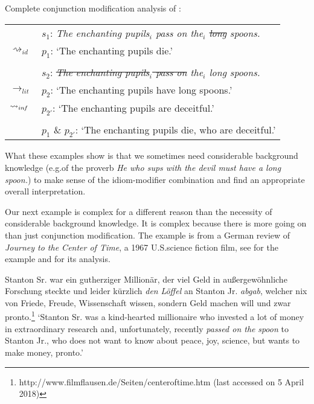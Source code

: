 \documentclass[output=paper]{langsci/langscibook}
\begin{document}
\ea \label{analysis long spoons -- complete} 
Complete conjunction modification analysis of : \\
\vspace{5pt}
\begin{tabular}{ll}
								& 	$s_{1}$: \hspace{4pt} \textit{The enchanting pupils$_{i}$ pass on the$_{i}$ \sout{long} spoons.} \\
$\rightsquigarrow_{id}$				&	$p_{1}$: \hspace{1pt} `The enchanting pupils die.' \\
\vspace{-5pt} \\
								& 	$s_{2}$: \hspace{4pt} \textit{\sout{The enchanting pupils$_{i}$ pass on} the$_{i}$ long spoons.} \\
$\rightarrow_{lit}$					&	$p_{2}$: \hspace{1pt} `The enchanting pupils have long spoons.' \\
$\rightsquigarrow_{in\hspace{-0.8pt} f}$	&	$p_{2'}$: \hspace{-1.5pt} `The enchanting pupils are deceitful.' \\
\vspace{-5pt} \\
								&	$p_{1}$ \& $p_{2'}$: `The enchanting pupils die, who are deceitful.' \\
\end{tabular}
\z

What these examples show is that we sometimes need considerable background knowledge (e.g.\@ of the proverb \textit{He who sups with the devil must have a long spoon.}) to make sense of the idiom-modifier combination and find an appropriate overall interpretation.

Our next example is complex for a different reason than the necessity of considerable background knowledge. It is complex because there is more going on than just conjunction modification. The example is from a German review of \textit{Journey to the Center of Time}, a 1967 U.S.\@ science fiction film, see  for the example and  for its analysis.

\ea \label{silver spoon}
Stanton Sr. war ein gutherziger Millionär, der viel Geld in außergewöhnliche Forschung steckte und leider kürzlich \textit{den} \underline{} \textit{Löffel} an Stanton Jr. \textit{abgab}, welcher nix von Friede, Freude, Wissenschaft wissen, sondern Geld machen will und zwar pronto.\footnote{http://www.filmflausen.de/Seiten/centeroftime.htm (last accessed on 5 April 2018)}
\vspace{5pt}
\glt `Stanton Sr. was a kind-hearted millionaire who invested a lot of money in extraordinary research and, unfortunately, recently \textit{passed on the} \underline{} \textit{spoon} to Stanton Jr., who does not want to know about peace, joy, science, but wants to make money, pronto.'
\z
\end{document}

